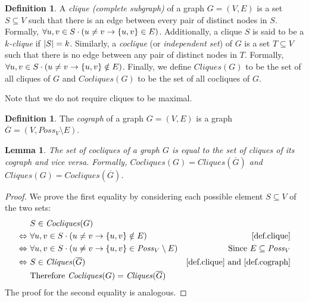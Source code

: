 \documentclass{report}
\DeclarePairedDelimiter{\set}{\{}{\}}
\DeclarePairedDelimiter{\abs}{\lvert}{\rvert}
\newtheorem{lemma}[theorem]{Lemma}
\theoremstyle{definition}
\newtheorem{definition}[theorem]{Definition}
\begin{document}
\begin{definition} \label{def.clique}
A \emph{clique (complete subgraph)} of a graph $G = (V, E)$ is a set
$S \subseteq V$ such that there is an edge between every pair of distinct nodes
in $S$. Formally, $\forall u, v \in S \cdot (u \neq v \rightarrow \set{u, v} \in E)$.
Additionally, a clique $S$ is said to be a \emph{$k$-clique} if $\abs{S} = k$.
Similarly, a \emph{coclique} (or \emph{independent set}) of $G$ is a set
$T \subseteq V$ such that there is no edge between any pair of distinct nodes in
$T$. Formally,
$\forall u, v \in S \cdot (u \neq v \rightarrow \set{u, v} \notin E)$.
Finally, we define $\mathit{Cliques}(G)$ to be the set of all cliques of $G$ and
$\mathit{Cocliques}(G)$ to be the set of all cocliques of $G$.

Note that we do not require cliques to be maximal.
\end{definition}

\begin{definition} \label{def.cograph}
The \emph{cograph} of a graph $G = (V, E)$ is a graph
$\overline{G} = (V, \mathit{Poss}_V \setminus E)$.
\end{definition}

\begin{lemma} \label{lma.cliques_of_cograph}
The set of cocliques of a graph $G$ is equal to the set of cliques of its cograph
and vice versa. Formally, $\mathit{Cocliques}(G) = \mathit{Cliques}(\overline{G})$ and
$\mathit{Cliques}(G) = \mathit{Cocliques}(\overline{G})$.
\end{lemma}

\begin{proof}
We prove the first equality by considering each possible element $S \subseteq V$ of
the two sets:
\begin{align*}
& S \in \mathit{Cocliques}(G) \\
\Leftrightarrow \ &
\forall u, v \in S \cdot (u \neq v \rightarrow \set{u, v} \notin E)
& \text{\cref{def.clique}} \\
\Leftrightarrow \ &
\forall u, v \in S \cdot (u \neq v \rightarrow \set{u, v} \in \mathit{Poss}_V \setminus E)
& \text{Since } E \subseteq \mathit{Poss}_V \\
\Leftrightarrow \ &
S \in \mathit{Cliques}(\overline{G})
& \text{\cref{def.clique} and \cref{def.cograph}} \\
& \text{Therefore } \mathit{Cocliques}(G) = \mathit{Cliques}(\overline{G})
\end{align*}
The proof for the second equality is analogous.
\end{proof}
\end{document}
